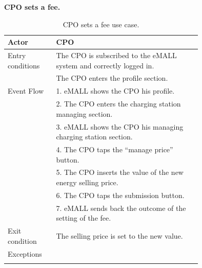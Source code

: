 \textbf{CPO sets a fee.}
\begin{center}
    \begin{longtable}{lp{0.75\linewidth}}
        \hline
        Actor            & CPO                                                                \\
        \hline
        Entry conditions & The CPO is subscribed to the eMALL system and correctly logged in. \\
        & The CPO enters the profile section.                                \\
        \hline
        Event Flow       & 1. eMALL shows the CPO his profile.                                \\
        & 2. The CPO enters the charging station managing section.           \\
        & 3. eMALL shows the CPO his managing charging station section.      \\
        & 4. The CPO taps the ``manage price'' button.                       \\
        & 5. The CPO inserts the value of the new energy selling price.      \\
        & 6. The CPO taps the submission button.                             \\
        & 7. eMALL sends back the outcome of the setting of the fee.         \\
        \hline
        Exit condition   & The selling price is set to the new value.                         \\
        \hline
        Exceptions       &                                                                    \\
        \hline
        \caption{CPO sets a fee use case.}
        \label{tab: CPO_sets_fee_use_case}
    \end{longtable}
\end{center}

